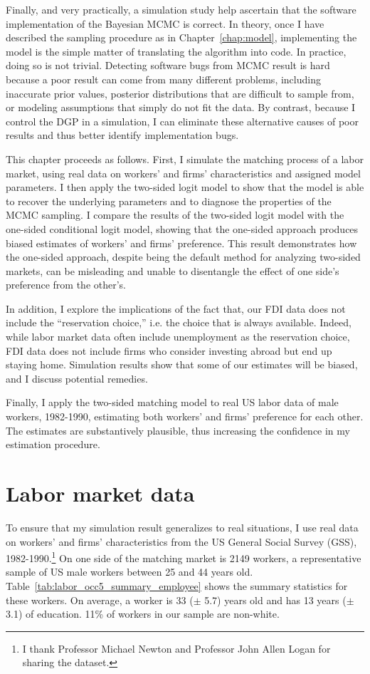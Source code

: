 Finally, and very practically, a simulation study help ascertain that the
software implementation of the Bayesian MCMC is correct. In theory, once I have
described the sampling procedure as in Chapter~\ref{chap:model}, implementing
the model is the simple matter of translating the algorithm into code. In
practice, doing so is not trivial. Detecting software bugs from MCMC result is
hard because a poor result can come from many different problems, including
inaccurate prior values, posterior distributions that are difficult to sample
from, or modeling assumptions that simply do not fit the data. By contrast,
because I control the DGP in a simulation, I can eliminate these alternative
causes of poor results and thus better identify implementation bugs.

This chapter proceeds as follows. First, I simulate the matching process of a
labor market, using real data on workers' and firms' characteristics and
assigned model parameters. I then apply the two-sided logit model to show that
the model is able to recover the underlying parameters and to diagnose the
properties of the MCMC sampling. I compare the results of the two-sided logit
model with the one-sided conditional logit model, showing that the one-sided
approach produces biased estimates of workers' and firms' preference. This
result demonstrates how the one-sided approach, despite being the default method
for analyzing two-sided markets, can be misleading and unable to disentangle the
effect of one side's preference from the other's.

In addition, I explore the implications of the fact that, our FDI data does not
include the ``reservation choice,'' i.e. the choice that is always available.
Indeed, while labor market data often include unemployment as the reservation
choice, FDI data does not include firms who consider investing abroad but end up
staying home. Simulation results show that some of our estimates will be biased,
and I discuss potential remedies.

Finally, I apply the two-sided matching model to real US labor data of male
workers, 1982-1990, estimating both workers' and firms' preference for each
other. The estimates are substantively plausible, thus increasing the confidence
in my estimation procedure.

\section{Labor market data}

To ensure that my simulation result generalizes to real situations, I use real
data on workers' and firms' characteristics from the US General Social Survey
(GSS), 1982-1990.\footnote{I thank Professor Michael Newton and Professor John
  Allen Logan for sharing the dataset.} On one side of the matching market is
2149 workers, a representative sample of US male workers between 25 and 44 years
old. Table~\ref{tab:labor_occ5_summary_employee} shows the summary statistics
for these workers. On average, a worker is 33 ($\pm$ 5.7) years old and has 13
years ($\pm$ 3.1) of education. 11\% of workers in our sample are non-white.

